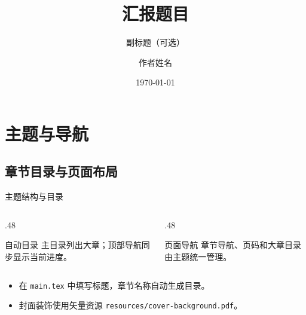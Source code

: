 \documentclass[hyperref, UTF8, CJK, aspectratio=169]{beamer}
\title[汇报题目]{汇报题目}
\subtitle{ 副标题（可选）}
\author[ 作者姓名]{作者姓名}
\institute{单位名称}
\date{\today}
\begin{document}
\section{主题与导航}
\subsection{章节目录与页面布局}

\begin{frame}{主题结构与目录}
  \begin{columns}[T,onlytextwidth]
    \begin{column}{.48\textwidth}
      \begin{ResearchCard}{自动目录}
        主目录列出大章；顶部导航同步显示当前进度。
      \end{ResearchCard}
    \end{column}
    \begin{column}{.48\textwidth}
      \begin{ResearchCard}{页面导航}
        章节导航、页码和大章目录由主题统一管理。
      \end{ResearchCard}
    \end{column}
  \end{columns}
  \vspace{.5em}
  \begin{itemize}
    \item 在 \texttt{main.tex} 中填写标题，章节名称自动生成目录。
    \item 封面装饰使用矢量资源 \texttt{resources/cover-background.pdf}。
  \end{itemize}
\end{frame}
\end{document}
